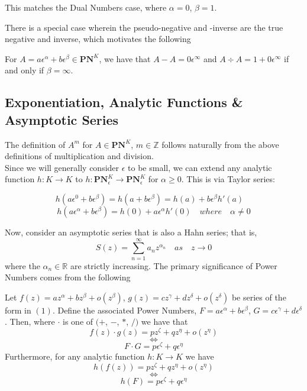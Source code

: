 \documentclass[acmsmall]{acmart}
\begin{document}
This matches the Dual Numbers case, where $\alpha = 0$, $\beta = 1$.

There is a special case wherein the pseudo-negative and -inverse are the true negative and inverse, which motivates the following
\begin{proposition}
For $A = a\epsilon^\alpha + b\epsilon^\beta \in \mathbf{PN}^K$, we have that $A-A=0\epsilon^\infty$ and $A \div A = 1 + 0\epsilon^\infty$ if and only if $\beta = \infty$.
\end{proposition}

\subsection{Exponentiation, Analytic Functions \& Asymptotic Series}

The definition of $A^m$ for $A \in \mathbf{PN}^K$, $m \in \mathbb{Z}$ follows naturally from the above definitions of multiplication and division. \\
Since we will generally consider $\epsilon$ to be small, we can extend any analytic function $h:K \rightarrow K$ to $h:\mathbf{PN}^K_{\epsilon} \rightarrow \mathbf{PN}^K_{\epsilon}$ for $\alpha \geq 0$. This is via Taylor series:

$$h(a\epsilon^0+b\epsilon^\beta) = h(a+b\epsilon^\beta) = h(a) + b\epsilon^\beta h'(a) \quad$$
$$h(a\epsilon^\alpha+b\epsilon^\beta) = h(0) + a\epsilon^\alpha h'(0) \quad where \quad \alpha \neq 0$$

Now, consider an asymptotic series that is also a Hahn series; that is,
\begin{equation}
S(z) = \sum_{n=1}^{\infty}a_nz^{\alpha_n} \quad as \quad z \rightarrow 0
\end{equation}
where the $\alpha_n \in \mathbb{R}$ are strictly increasing.
The primary significance of Power Numbers comes from the following 
\begin{proposition}
	Let $f(z) = az^\alpha + bz^\beta + o(z^\beta)$,	$g(z) = cz^\gamma + dz^\delta + o(z^\delta)$ be series of the form in $(1)$.
	Define the associated Power Numbers, $F = a\epsilon^\alpha + b\epsilon^\beta$, $G = c\epsilon^\gamma + d\epsilon^\delta$.
	Then, where $\cdot$ is one of $(+$, $-$, $*$, $/)$ we have that 
	$$f(z) \cdot g(z) = pz^\zeta + qz^\eta + o(z^\eta)$$
	$$\Leftrightarrow$$
	$$F \cdot G = p\epsilon^\zeta + q\epsilon^\eta$$
	Furthermore, for any analytic function $h:K \rightarrow K$ we have
	$$h(f(z)) = pz^\zeta + qz^\eta + o(z^\eta)$$ 
	$$\Leftrightarrow$$
	$$h(F) = p\epsilon^\zeta + q\epsilon^\eta$$
\end{proposition}
\end{document}
